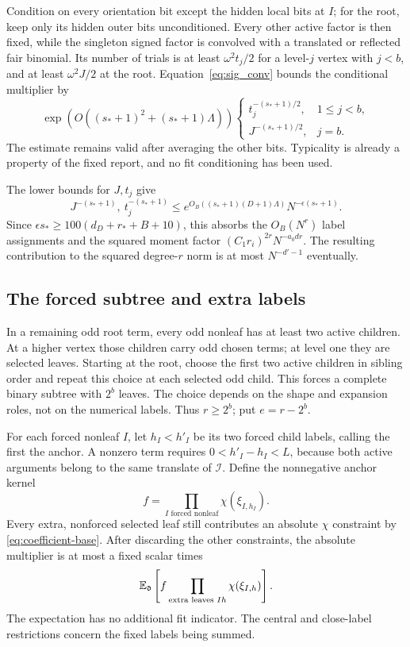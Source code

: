 Condition on every orientation bit except the hidden local bits at $I$; for the root, keep only its hidden outer bits unconditioned.  Every other active factor is then fixed, while the singleton signed factor is convolved with a translated or reflected fair binomial.  Its number of trials is at least $\omega^2t_j/2$ for a level-$j$ vertex with $j<b$, and at least $\omega^2J/2$ at the root.  Equation~\eqref{eq:sig_conv} bounds the conditional multiplier by
\[
 \exp(O((s_*+1)^2+(s_*+1)\Lambda))
 \begin{cases}
 t_j^{-(s_*+1)/2},&1\le j<b,\\
 J^{-(s_*+1)/2},&j=b.
 \end{cases}
\]
The estimate remains valid after averaging the other bits.  Typicality is already a property of the fixed report, and no fit conditioning has been used.

The lower bounds for $J,t_j$ give
\[
 J^{-(s_*+1)},\ t_j^{-(s_*+1)}
 \le e^{O_B((s_*+1)(D+1)\Lambda)}
       N^{-\epsilon(s_*+1)}.
\]
Since $\epsilon s_*\ge100(d_D+r_*+B+10)$, this absorbs the $O_B(N^r)$ label assignments and the squared moment factor $(C_1r_i)^{2r}N^{-a_0dr}$.  The resulting contribution to the squared degree-$r$ norm is at most $N^{-d'-1}$ eventually.

\subsection{The forced subtree and extra labels}

In a remaining odd root term, every odd nonleaf has at least two active children.  At a higher vertex those children carry odd chosen terms; at level one they are selected leaves.  Starting at the root, choose the first two active children in sibling order and repeat this choice at each selected odd child.  This forces a complete binary subtree with $2^b$ leaves.  The choice depends on the shape and expansion roles, not on the numerical labels.  Thus $r\ge2^b$; put $e=r-2^b$.

For each forced nonleaf $I$, let $h_I<h'_I$ be its two forced child labels, calling the first the anchor.  A nonzero term requires
$0<h'_I-h_I<L$, because both active arguments belong to the same translate of $\mathcal I$.  Define the nonnegative anchor kernel
\[
 f=\prod_{I\text{ forced nonleaf}}\chi(\xi_{I,h_I}).
\]
Every extra, nonforced selected leaf still contributes an absolute $\chi$ constraint by \eqref{eq:coefficient-base}.  After discarding the other constraints, the absolute multiplier is at most a fixed scalar times
\begin{equation}\label{eq:anchor-extra-bound}
 \mathbb E_{\mathfrak d}\left[f\prod_{\text{extra leaves }Ih}
       \chi(\xi_{I,h})\right].
\end{equation}
The expectation has no additional fit indicator.  The central and close-label restrictions concern the fixed labels being summed.


